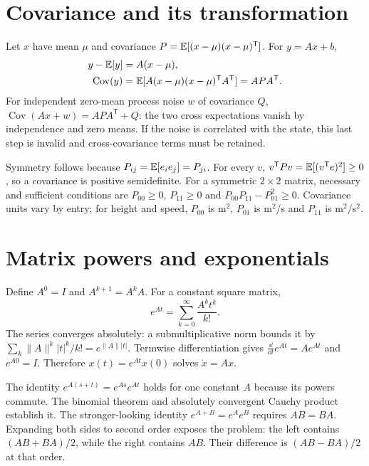 \section{Covariance and its transformation}
Let $x$ have mean $\mu$ and covariance
$P=\mathbb{E}[(x-\mu)(x-\mu)^{\mathsf T}]$. For $y=Ax+b$,
\begin{align}
y-\mathbb{E}[y]&=A(x-\mu),\\
\operatorname{Cov}(y)
 &=\mathbb{E}[A(x-\mu)(x-\mu)^{\mathsf T}A^{\mathsf T}]
 =APA^{\mathsf T}.
\end{align}
For independent zero-mean process noise $w$ of covariance $Q$,
$\operatorname{Cov}(Ax+w)=APA^{\mathsf T}+Q$: the two cross expectations
vanish by independence and zero means. If the noise is correlated with the
state, this last step is invalid and cross-covariance terms must be retained.

Symmetry follows because $P_{ij}=\mathbb{E}[e_i e_j]=P_{ji}$. For every $v$,
$v^{\mathsf T}Pv=\mathbb{E}[(v^{\mathsf T}e)^2]\geq0$, so a covariance is positive
semidefinite. For a symmetric $2\times2$ matrix, necessary and sufficient
conditions are $P_{00}\geq0$, $P_{11}\geq0$ and
$P_{00}P_{11}-P_{01}^2\geq0$. Covariance units vary by entry; for height and
speed, $P_{00}$ is m$^2$, $P_{01}$ is m$^2$/s and $P_{11}$ is m$^2$/s$^2$.

\section{Matrix powers and exponentials}
Define $A^0=I$ and $A^{k+1}=A^kA$. For a constant square matrix,
\begin{equation}e^{At}=\sum_{k=0}^{\infty}\frac{A^k t^k}{k!}.\end{equation}
The series converges absolutely: a submultiplicative norm bounds it by
$\sum_k\|A\|^k|t|^k/k!=e^{\|A\||t|}$. Termwise differentiation gives
$\frac{\dd}{\dd t}e^{At}=Ae^{At}$ and $e^{A0}=I$. Therefore
$x(t)=e^{At}x(0)$ solves $\dot x=Ax$.

The identity $e^{A(s+t)}=e^{As}e^{At}$ holds for one constant $A$ because
its powers commute. The binomial theorem and absolutely convergent Cauchy
product establish it. The stronger-looking identity
$e^{A+B}=e^Ae^B$ requires $AB=BA$. Expanding both sides to second order
exposes the problem: the left contains $(AB+BA)/2$, while the right
contains $AB$. Their difference is $(AB-BA)/2$ at that order.

